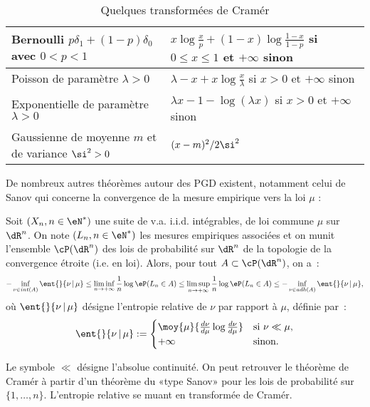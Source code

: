 \begin{table}[htbp]
  \begin{center}\small
    \begin{tabular}[c]{|l|l|}\hline
      Bernoulli $p\delta_1 + (1-p)\delta_0$ avec $0<p<1$&
      $x\log\frac{x}{p} + (1-x)\log\frac{1-x}{1-p}$ si
      $0\leq x\leq 1$ et $+\infty$ sinon \\ \hline
      Poisson de paramètre $\lambda>0$ &
      $\lambda-x+x\log\frac{x}{\lambda}$ si $x>0$ et $+\infty$ sinon \\ \hline
      Exponentielle de paramètre $\lambda>0$ &
      $\lambda x -1 -\log(\lambda x)$ si $x>0$ et $+\infty$ sinon\\ \hline
      Gaussienne de moyenne $m$ et de variance $\si^2>0$ &
      $(x-m)^2/{2\si^2}$ \\ \hline
    \end{tabular}
    \caption{Quelques transformées de Cramér}
    \label{tab:exple-transfo-cramer}
  \end{center}
\end{table}
De nombreux autres théorèmes autour des PGD existent, notamment celui de Sanov
qui concerne la convergence de la mesure empirique vers la loi $\mu$ :
\begin{theorem}
  Soit $(X_n,n\in\eN^*)$ une suite de v.a. i.i.d. intégrables, de loi commune
  $\mu$ sur $\dR^n$. On note $(L_n,n\in\eN^*)$ les mesures empiriques associées et
  on munit l'ensemble $\cP(\dR^n)$ des lois de probabilité sur $\dR^n$ de la
  topologie de la convergence étroite (i.e. en loi).  Alors, pour tout
  $A\subset\cP(\dR^n)$, on a~:
$$
-\inf_{\nu\in int(A)} \ent{}{\nu\,\vert\,\mu}
\leq
\liminf_{n\to+\infty} \frac{1}{n}\log\eP(L_n\in A)
\leq 
\limsup_{n\to+\infty} \frac{1}{n}\log\eP(L_n\in A)
\leq
-\inf_{\nu\in adh(A)} \ent{}{\nu\,\vert\,\mu},
$$
où $\ent{}{\nu\,\vert\,\mu}$ désigne l'entropie relative de $\nu$ par rapport
à $\mu$, définie par~:
$$
\ent{}{\nu\,\vert\,\mu}:=
\begin{cases}
\moy{\mu}{\frac{d\nu}{d\mu}\log \frac{d\nu}{d\mu}} & \text{si } \nu \ll \mu,\\
+\infty & \text{sinon}.
\end{cases}
$$
\end{theorem}
Le symbole $\ll$ désigne l'absolue continuité. On peut retrouver le théorème
de Cramér à partir d'un théorème du «type Sanov» pour les lois de probabilité
sur $\{1,\ldots,n\}$. L'entropie relative se muant en transformée de Cramér.

